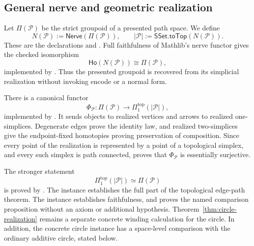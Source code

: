 \documentclass{lmcs}
\theoremstyle{definition}
\theoremstyle{plain}
\theoremstyle{remark}
\begin{document}
\subsection{General nerve and geometric realization}

Let \(\Pi(\mathcal P)\) be the strict groupoid of a presented path space.
We define
\[
N(\mathcal P):=\mathsf{Nerve}(\Pi(\mathcal P)),
\qquad
\lvert\mathcal P\rvert:=\mathsf{SSet.toTop}(N(\mathcal P)).
\]
These are the declarations  and
.
Full faithfulness of Mathlib's nerve functor gives the checked isomorphism
\[
\mathsf{Ho}(N(\mathcal P))\cong\Pi(\mathcal P),
\]
implemented by .  Thus the presented
groupoid is recovered from its simplicial realization without invoking encode
or a normal form.

There is a canonical functor
\[
\Phi_{\mathcal P}\colon
\Pi(\mathcal P)\longrightarrow
\Pi_1^{\mathrm{top}}(\lvert\mathcal P\rvert),
\]
implemented by .
It sends objects to realized vertices and arrows to realized one-simplices.
Degenerate edges prove the identity law, and realized two-simplices give the
endpoint-fixed homotopies proving preservation of composition.  Since every
point of the realization is represented by a point of a topological simplex,
and every such simplex is path connected,
 proves that \(\Phi_{\mathcal P}\)
is essentially surjective.

The stronger statement
\[
\Pi_1^{\mathrm{top}}(\lvert\mathcal P\rvert)\simeq\Pi(\mathcal P)
\]
is proved by
.
The instance  establishes the full
part of the topological edge-path theorem.  The instance
 establishes faithfulness, and
 proves the named
comparison proposition without an axiom or additional hypothesis.
Theorem~\ref{thm:circle-realization} remains a separate concrete winding
calculation for the circle.  In addition, the concrete circle instance has a
space-level comparison with the ordinary additive circle, stated below.
\end{document}
